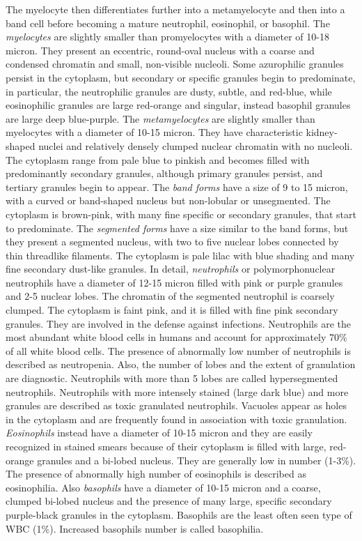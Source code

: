 \documentclass[final,a4paper,12pt,english]{UnicaPhdThesis3}
\begin{document}
{The myelocyte then differentiates further into a metamyelocyte and then into a band cell before becoming a mature neutrophil, eosinophil, or basophil. The \textit{myelocytes} are slightly smaller than promyelocytes with a diameter of 10-18 micron. They present an eccentric, round-oval nucleus with a coarse and condensed chromatin and small, non-visible nucleoli. Some azurophilic granules persist in the cytoplasm, but secondary or specific granules begin to predominate, in particular, the neutrophilic granules are dusty, subtle, and red-blue, while eosinophilic granules are large red-orange and singular, instead basophil granules are large deep blue-purple. The \textit{metamyelocytes} are slightly smaller than myelocytes with a diameter of  10-15 micron. They have characteristic kidney-shaped nuclei and relatively densely clumped nuclear chromatin with no nucleoli. The cytoplasm range from pale blue to pinkish and becomes filled with predominantly secondary granules, although primary granules persist, and tertiary granules begin to appear. The \textit{band forms} have a size of 9 to 15 micron, with a curved or band-shaped nucleus but non-lobular or unsegmented. The cytoplasm is brown-pink, with many fine specific or secondary granules, that start to predominate. The \textit{segmented forms} have a size similar to the band forms, but they present a segmented nucleus, with two to five nuclear lobes connected by thin threadlike filaments. The cytoplasm is pale lilac with blue shading and many fine secondary dust-like granules. In detail, \textit{neutrophils} or polymorphonuclear neutrophils have a diameter of 12-15 micron filled with pink or purple granules and 2-5 nuclear lobes. The chromatin of the segmented neutrophil is coarsely clumped. The cytoplasm is faint pink, and it is filled with fine pink secondary granules. They are involved in the defense against infections. Neutrophils are the most abundant white blood cells in humans and account for approximately 70\% of all white blood cells. The presence of abnormally low number of neutrophils is described as neutropenia. Also, the number of lobes and the extent of granulation are diagnostic. Neutrophils with more than 5 lobes are called hypersegmented neutrophils. Neutrophils with more intensely stained (large dark blue) and more granules are described as toxic granulated neutrophils. Vacuoles appear as holes in the cytoplasm and are frequently found in association with toxic granulation. \textit{Eosinophils} instead have a diameter of 10-15 micron and they are easily recognized in stained smears because of their cytoplasm is filled with large, red-orange granules and a bi-lobed nucleus. They are generally low in number (1-3\%). The presence of abnormally high number of eosinophils is described as eosinophilia. Also \textit{basophils} have a diameter of 10-15 micron and a coarse, clumped bi-lobed nucleus and the presence of many large, specific secondary purple-black granules in the cytoplasm. Basophils are the least often seen type of WBC (1\%). Increased basophils number is called basophilia.

}
\end{document}
